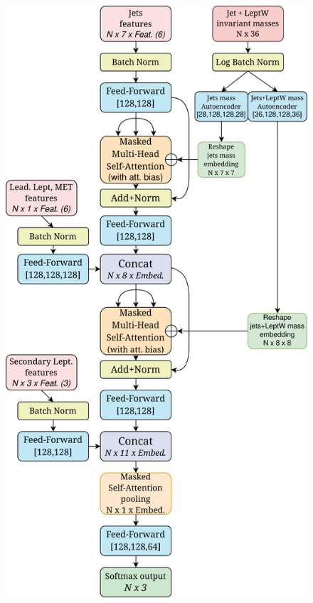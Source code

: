 \begin{figure}[H]
    \centering
    \includegraphics[height=0.805\textheight]{fig//chap09-sigback/SBANet.png}
    \label{fig:SBANet}
\end{figure}

